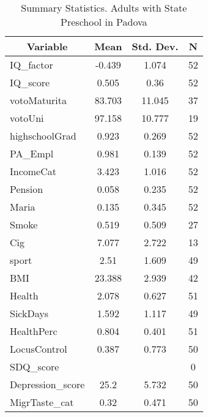 
\begin{table}[htbp]\centering \caption{Summary Statistics. Adults with State Preschool in Padova \label{bothAdultmaternaStatPadova}}
\begin{tabular}{l c c  c}\hline\hline
\multicolumn{1}{c}{\textbf{Variable}} & \textbf{Mean}
 & \textbf{Std. Dev.} & \textbf{N}\\ \hline
IQ\_factor & -0.439 & 1.074  & 52\\
IQ\_score & 0.505 & 0.36  & 52\\
votoMaturita & 83.703 & 11.045  & 37\\
votoUni & 97.158 & 10.777  & 19\\
highschoolGrad & 0.923 & 0.269  & 52\\
PA\_Empl & 0.981 & 0.139  & 52\\
IncomeCat & 3.423 & 1.016  & 52\\
Pension & 0.058 & 0.235  & 52\\
Maria & 0.135 & 0.345  & 52\\
Smoke & 0.519 & 0.509  & 27\\
Cig & 7.077 & 2.722  & 13\\
sport & 2.51 & 1.609  & 49\\
BMI & 23.388 & 2.939  & 42\\
Health & 2.078 & 0.627  & 51\\
SickDays & 1.592 & 1.117  & 49\\
HealthPerc & 0.804 & 0.401  & 51\\
LocusControl & 0.387 & 0.773  & 50\\
SDQ\_score &  &   & 0\\
Depression\_score & 25.2 & 5.732  & 50\\
MigrTaste\_cat & 0.32 & 0.471  & 50\\
\hline\end{tabular}
\end{table}
